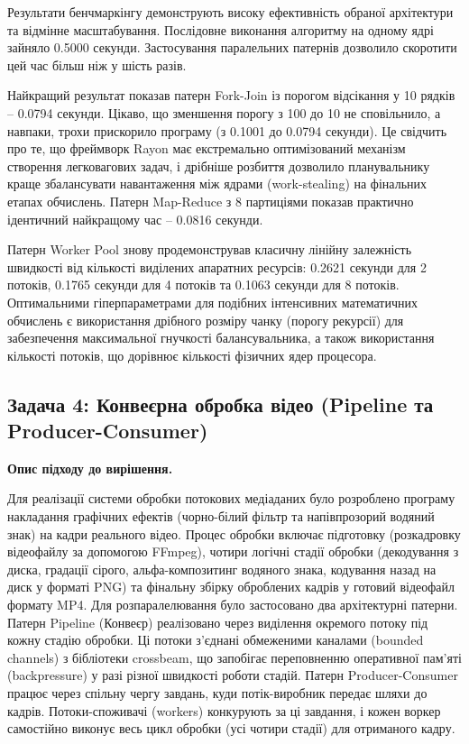 \documentclass[14pt, a4paper]{extreport}
\begin{document}
	Результати бенчмаркінгу демонструють високу ефективність обраної архітектури та відмінне масштабування. Послідовне виконання алгоритму на одному ядрі зайняло 0.5000 секунди. Застосування паралельних патернів дозволило скоротити цей час більш ніж у шість разів.
	
	
	Найкращий результат показав патерн Fork-Join із порогом відсікання у 10 рядків -- 0.0794 секунди. Цікаво, що зменшення порогу з 100 до 10 не сповільнило, а навпаки, трохи прискорило програму (з 0.1001 до 0.0794 секунди). Це свідчить про те, що фреймворк Rayon має екстремально оптимізований механізм створення легковагових задач, і дрібніше розбиття дозволило планувальнику краще збалансувати навантаження між ядрами (work-stealing) на фінальних етапах обчислень. Патерн Map-Reduce з 8 партиціями показав практично ідентичний найкращому час -- 0.0816 секунди.
	
	Патерн Worker Pool знову продемонстрував класичну лінійну залежність швидкості від кількості виділених апаратних ресурсів: 0.2621 секунди для 2 потоків, 0.1765 секунди для 4 потоків та 0.1063 секунди для 8 потоків. Оптимальними гіперпараметрами для подібних інтенсивних математичних обчислень є використання дрібного розміру чанку (порогу рекурсії) для забезпечення максимальної гнучкості балансувальника, а також використання кількості потоків, що дорівнює кількості фізичних ядер процесора.
	
	
	\subsection{Задача 4: Конвеєрна обробка відео (Pipeline та Producer-Consumer)}
	
	\textbf{Опис підходу до вирішення.}
	
	Для реалізації системи обробки потокових медіаданих було розроблено програму накладання графічних ефектів (чорно-білий фільтр та напівпрозорий водяний знак) на кадри реального відео. Процес обробки включає підготовку (розкадровку відеофайлу за допомогою FFmpeg), чотири логічні стадії обробки (декодування з диска, градації сірого, альфа-композитинг водяного знака, кодування назад на диск у форматі PNG) та фінальну збірку оброблених кадрів у готовий відеофайл формату MP4. Для розпаралелювання було застосовано два архітектурні патерни. Патерн Pipeline (Конвеєр) реалізовано через виділення окремого потоку під кожну стадію обробки. Ці потоки з'єднані обмеженими каналами (bounded channels) з бібліотеки crossbeam, що запобігає переповненню оперативної пам'яті (backpressure) у разі різної швидкості роботи стадій. Патерн Producer-Consumer працює через спільну чергу завдань, куди потік-виробник передає шляхи до кадрів. Потоки-споживачі (workers) конкурують за ці завдання, і кожен воркер самостійно виконує весь цикл обробки (усі чотири стадії) для отриманого кадру.
	
\end{document}
